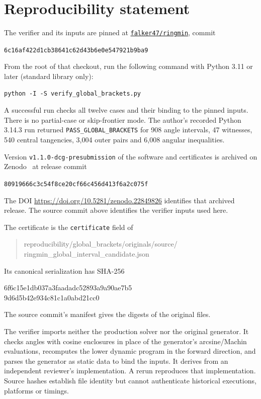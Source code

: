 \documentclass[11pt]{article}
\theoremstyle{definition}
\theoremstyle{remark}
\newcommand{\snapshot}{6c16af422d1cb38641c62d43b6e0e547921b9ba9}
\begin{document}
\section{Reproducibility statement}\label{sec:repro}
The verifier and its inputs are pinned at
\href{https://github.com/falker47/ringmin/tree/6c16af422d1cb38641c62d43b6e0e547921b9ba9}{\texttt{falker47/ringmin}},
commit
\begin{center}\small\texttt{\snapshot}\end{center}
From the root of that checkout, run the following command with Python 3.11
or later (standard library only):
\begin{verbatim}
python -I -S verify_global_brackets.py
\end{verbatim}
A successful run checks all twelve cases and their binding to the pinned
inputs. There is no partial-case or skip-frontier mode. The author's
recorded Python 3.14.3 run returned \texttt{PASS\_GLOBAL\_BRACKETS} for
908 angle intervals, 47 witnesses, 540 central tangencies, 3,004 outer
pairs and 6,008 angular inequalities.

Version \texttt{v1.1.0-dcg-presubmission} of the software and certificates
is archived on Zenodo~\cite{ringmin-archive} at release commit
\begin{center}\small\texttt{80919666c3c54f8ce20cf66c456d413f6a2c075f}\end{center}
The DOI \url{https://doi.org/10.5281/zenodo.22849826} identifies that
archived release. The source commit above identifies the verifier inputs
used here.

The certificate is the \texttt{certificate} field of
\begin{quote}\small\ttfamily\raggedright
reproducibility/global\_brackets/originals/source/\allowbreak
ringmin\_global\_interval\_candidate.json
\end{quote}
Its canonical serialization has SHA-256
\begin{center}\small\ttfamily
6f6c15e1db037a3faadadc52893a9a90ae7b5\\
9d6d5b42e934c81c1a0abd21cc0
\end{center}
The source commit's manifest gives the digests of the original files.

The verifier imports neither the production solver nor the original
generator. It checks angles with cosine enclosures in place of the
generator's arcsine/Machin evaluations, recomputes the lower dynamic
program in the forward direction, and parses the generator as static data
to bind the inputs. It derives from an independent reviewer's
implementation. A rerun reproduces that implementation. Source hashes
establish file identity but cannot authenticate historical executions,
platforms or timings.
\end{document}
